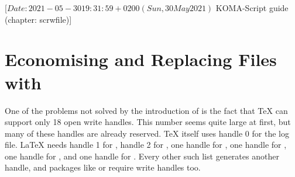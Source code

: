 %
%
%
%
%
%
%
%
% 
%
%
%
%

%
                 [$Date: 2021-05-30 19:31:59 +0200 (Sun, 30 May 2021) $
                  KOMA-Script guide (chapter: scrwfile)]



\chapter{Economising and Replacing Files with }
\BeginIndexGroup
{}

One of the problems not solved by the introduction of \eTeX{} is the fact that
\TeX{} can support only 18 open write handles. This number seems quite large
at first, but many of these handles are already reserved. \TeX{} itself uses
handle 0 for the log file. \LaTeX{} needs handle 1 for ,
handle 2 for , one handle for , one
handle for , one handle for , and one
handle for . Every other such list generates another handle,
and packages like  or  require write
handles too.

